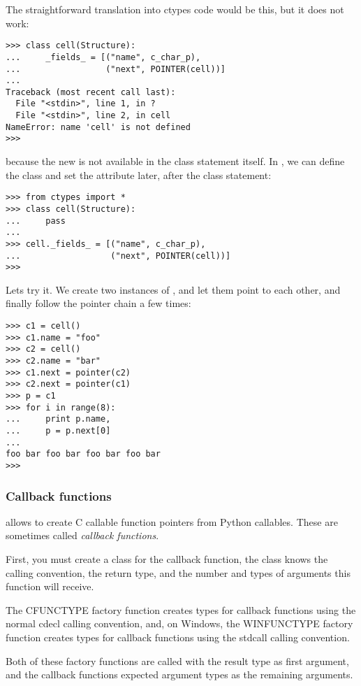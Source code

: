 The straightforward translation into ctypes code would be this, but it
does not work:
\begin{verbatim}
>>> class cell(Structure):
...     _fields_ = [("name", c_char_p),
...                 ("next", POINTER(cell))]
...
Traceback (most recent call last):
  File "<stdin>", line 1, in ?
  File "<stdin>", line 2, in cell
NameError: name 'cell' is not defined
>>>
\end{verbatim}

because the new  is not available in the class statement
itself.  In , we can define the  class and set the
 attribute later, after the class statement:
\begin{verbatim}
>>> from ctypes import *
>>> class cell(Structure):
...     pass
...
>>> cell._fields_ = [("name", c_char_p),
...                  ("next", POINTER(cell))]
>>>
\end{verbatim}

Lets try it. We create two instances of , and let them point
to each other, and finally follow the pointer chain a few times:
\begin{verbatim}
>>> c1 = cell()
>>> c1.name = "foo"
>>> c2 = cell()
>>> c2.name = "bar"
>>> c1.next = pointer(c2)
>>> c2.next = pointer(c1)
>>> p = c1
>>> for i in range(8):
...     print p.name,
...     p = p.next[0]
...
foo bar foo bar foo bar foo bar
>>>    
\end{verbatim}


\subsubsection{Callback functions\label{ctypes-callback-functions}}

 allows to create C callable function pointers from Python
callables. These are sometimes called \emph{callback functions}.

First, you must create a class for the callback function, the class
knows the calling convention, the return type, and the number and
types of arguments this function will receive.

The CFUNCTYPE factory function creates types for callback functions
using the normal cdecl calling convention, and, on Windows, the
WINFUNCTYPE factory function creates types for callback functions
using the stdcall calling convention.

Both of these factory functions are called with the result type as
first argument, and the callback functions expected argument types as
the remaining arguments.

